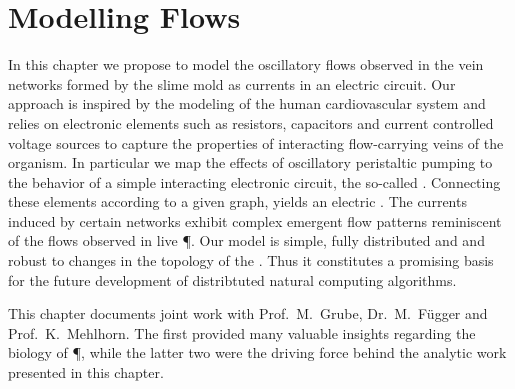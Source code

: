 \chapter{Modelling Flows}\label{chap:model}

	In this chapter we propose to model the oscillatory flows observed in the vein networks formed by the slime mold \Pp as currents in an electric circuit. Our approach is inspired by the modeling of the human cardiovascular system and relies on electronic elements such as resistors, capacitors and current controlled voltage sources to capture the properties of interacting flow-carrying veins of the organism. In particular we map the effects of oscillatory peristaltic pumping to the behavior of a simple interacting electronic circuit, the so-called \Pe. Connecting these elements according to a given graph, yields an electric \Pn. The currents induced by certain networks exhibit complex emergent flow patterns reminiscent of the flows observed in live \P. Our model is simple, fully distributed and and robust to changes in the topology of the \Pn. Thus it constitutes a promising basis for the future development of distribtuted natural computing algorithms.

	This chapter documents joint work with Prof.~M.~Grube, Dr.~M.~F\"ugger and Prof.~K.~Mehlhorn. The first provided many valuable insights regarding the biology of \P, while the latter two were the driving force behind the analytic work presented in this chapter.

	
	
	
	
	
	


